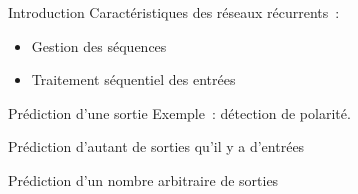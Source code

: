 \begin{frame}{Introduction}
  Caractéristiques des réseaux récurrents~:

  \begin{itemize}[<+->]
    \item Gestion des séquences
    \item Traitement séquentiel des entrées
  \end{itemize}
\end{frame}

\begin{frame}{Prédiction d'une sortie}
  Exemple~: détection de polarité.

  \begin{figure}
    \centering
  \end{figure}
\end{frame}

\begin{frame}{Prédiction d'autant de sorties qu'il y a d'entrées}
\end{frame}

\begin{frame}{Prédiction d'un nombre arbitraire de sorties}
\end{frame}
